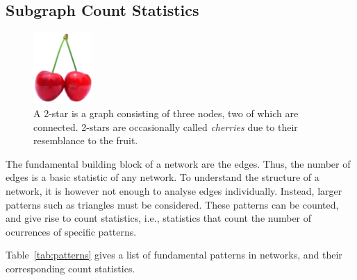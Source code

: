 \documentclass{article}
\begin{document}
\subsection{Subgraph Count Statistics}
\label{sec:count-statistics}
\begin{figure}
  \centering
  \includegraphics[width=0.20\textwidth]{img/Cherry_Stella444.jpg}
  \caption{
    A 2-star is a graph consisting of three nodes, two of which are
    connected.  2-stars are occasionally called \emph{cherries} due to
    their resemblance to the fruit.
    \label{fig:cherries}
  }
\end{figure}
The fundamental building block of a network are the edges.  Thus, the
number of edges is a basic statistic of any network.  To understand the
structure of a network, it is however not enough to analyse edges
individually.  Instead, larger patterns such as triangles must be
considered.  These patterns can be counted, and give rise to count
statistics, i.e., statistics that count the number of ocurrences of
specific patterns. 

Table~\ref{tab:patterns} gives a list of fundamental patterns in
networks, and their corresponding count statistics.
\end{document}
